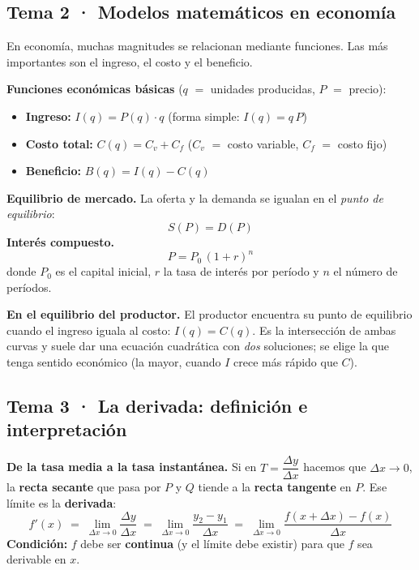 \documentclass[12pt, letterpaper]{article}
\begin{document}
\subsection{Tema 2 · Modelos matemáticos en economía}

En economía, muchas magnitudes se relacionan mediante funciones. Las más importantes son el ingreso, el costo y el beneficio.

\begin{cuadroteoria}
  \textbf{Funciones económicas básicas} ($q$ $=$ unidades producidas, $P$ $=$ precio):
  \begin{itemize}
    \item \textbf{Ingreso:} $I(q) = P(q)\cdot q$ \qquad (forma simple: $I(q) = q\,P$)
    \item \textbf{Costo total:} $C(q) = C_v + C_f$ \hfill ($C_v$ $=$ costo variable, $C_f$ $=$ costo fijo)
    \item \textbf{Beneficio:} $B(q) = I(q) - C(q)$
  \end{itemize}
  \textbf{Equilibrio de mercado.} La oferta y la demanda se igualan en el \emph{punto de equilibrio}:
  \[
    S(P) = D(P)
  \]
  \textbf{Interés compuesto.}
  \[
    P = P_0\,(1 + r)^{n}
  \]
  donde $P_0$ es el capital inicial, $r$ la tasa de interés por período y $n$ el número de períodos.
\end{cuadroteoria}

\begin{cuadroextra}
  \textbf{En el equilibrio del productor.} El productor encuentra su punto de equilibrio cuando el ingreso iguala al costo: $I(q) = C(q)$. Es la intersección de ambas curvas y suele dar una ecuación cuadrática con \emph{dos} soluciones; se elige la que tenga sentido económico (la mayor, cuando $I$ crece más rápido que $C$).
\end{cuadroextra}

\subsection{Tema 3 · La derivada: definición e interpretación}

\begin{cuadroteoria}
  \textbf{De la tasa media a la tasa instantánea.} Si en $T = \dfrac{\Delta y}{\Delta x}$ hacemos que $\Delta x \to 0$, la \textbf{recta secante} que pasa por $P$ y $Q$ tiende a la \textbf{recta tangente} en $P$. Ese límite es la \textbf{derivada}:
  \[
    f'(x) \;=\; \lim_{\Delta x \to 0} \frac{\Delta y}{\Delta x}
    \;=\; \lim_{\Delta x \to 0} \frac{y_2 - y_1}{\Delta x}
    \;=\; \lim_{\Delta x \to 0} \frac{f(x + \Delta x) - f(x)}{\Delta x}
  \]
  \textbf{Condición:} $f$ debe ser \textbf{continua} (y el límite debe existir) para que $f$ sea derivable en $x$.
\end{cuadroteoria}
\end{document}
